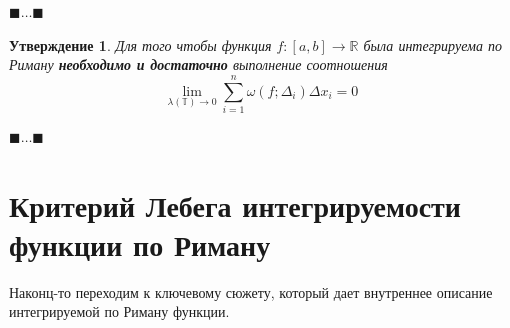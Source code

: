 \documentclass[a4paper,14pt]{article} %
\newtheorem{statement}{Утверждение}
\begin{document}
    \(\blacksquare \dots \blacksquare\) 
    
    \begin{statement}
    Для того чтобы функция $f : [a,b] \rightarrow \mathbb{R}$ была интегрируема по Риману \textbf{необходимо и достаточно} выполнение соотношения
    \begin{equation}
        \lim_{\lambda(\mathbb{T}) \rightarrow 0}{\sum_{i=1}^{n}{\omega(f;\Delta_i)\Delta x_i}} = 0
    \end{equation}
    \end{statement}
    
    \(\blacksquare \dots \blacksquare\) 
    
    \section[Критерий Лебега]{Критерий Лебега интегрируемости функции по Риману}
    Наконц-то переходим к ключевому сюжету, который дает внутреннее описание интегрируемой по Риману функции.
    
    
\end{document}
